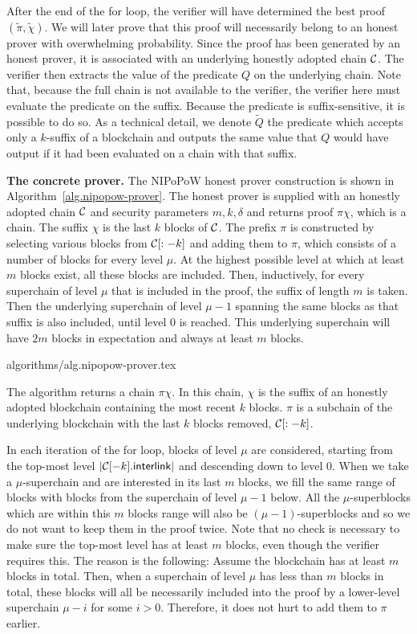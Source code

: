After the end of the for loop, the verifier will have determined the best proof
$(\tilde\pi, \tilde\chi)$. We will later prove that this proof will necessarily
belong to an honest prover with overwhelming probability. Since the proof has
been generated by an honest prover, it is associated with an underlying honestly
adopted chain $\mathcal{C}$. The verifier then extracts the value of the predicate
$Q$ on the underlying chain. Note that, because the full chain is not available
to the verifier, the verifier here must evaluate the predicate on the suffix.
Because the predicate is suffix-sensitive, it is possible to do so. As a
technical detail, we denote $\tilde Q$ the predicate which accepts only a
$k$-suffix of a blockchain and outputs the same value that $Q$ would have output
if it had been evaluated on a chain with that suffix.

\noindent
\textbf{The concrete prover.}
The NIPoPoW honest prover construction is shown in
Algorithm~\ref{alg.nipopow-prover}. The honest prover is supplied with an
honestly adopted chain $\mathcal{C}$ and security parameters $m, k, \delta$ and
returns proof $\pi\chi$, which is a chain. The suffix $\chi$ is the last $k$
blocks of $\mathcal{C}$. The prefix $\pi$ is constructed by selecting various blocks
from $\mathcal{C}[:-k]$ and adding them to $\pi$, which consists of a number of
blocks for every level $\mu$. At the highest possible level at which at least
$m$ blocks exist, all these blocks are included. Then, inductively, for every
superchain of level $\mu$ that is included in the proof, the suffix of length
$m$ is taken. Then the underlying superchain of level $\mu - 1$ spanning the
same blocks as that suffix is also included, until level $0$ is reached. This
underlying superchain will have $2m$ blocks in expectation and always at least
$m$ blocks.

{algorithms/alg.nipopow-prover.tex}

The algorithm returns a chain $\pi\chi$. In this chain, $\chi$ is the suffix of
an honestly adopted blockchain containing the most recent $k$ blocks. $\pi$ is a
subchain of the underlying blockchain with the last $k$ blocks removed,
$\mathcal{C}[:-k]$.

In each iteration of the for loop, blocks of level $\mu$ are considered,
starting from the top-most level $|\mathcal{C}[-k].\textsf{interlink}|$ and
descending down to level $0$. When we take a $\mu$-superchain and are interested
in its last $m$ blocks, we fill the same range of blocks with blocks from the
superchain of level $\mu - 1$ below. All the $\mu$-superblocks which are within
this $m$ blocks range will also be $(\mu-1)$-superblocks and so we do not want
to keep them in the proof twice. Note that no check is necessary to make sure
the top-most level has at least $m$ blocks, even though the verifier requires
this. The reason is the following: Assume the blockchain has at least $m$ blocks
in total. Then, when a superchain of level $\mu$ has less than $m$ blocks in
total, these blocks will all be necessarily included into the proof by a
lower-level superchain $\mu - i$ for some $i > 0$. Therefore, it does not hurt
to add them to $\pi$ earlier.

